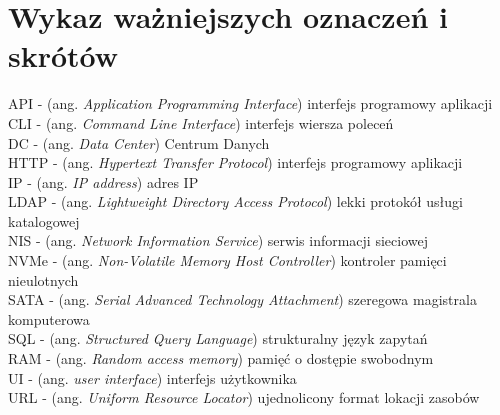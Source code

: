 \documentclass[10pt,a4paper,titlepage,twoside]{report}
\begin{document}
\newpage
{}

\tableofcontents


\newpage
{}
\section*{Wykaz ważniejszych oznaczeń i skrótów}

API - (ang. \textit{Application Programming Interface}) interfejs programowy aplikacji \\ \newline
CLI - (ang. \textit{Command Line Interface}) interfejs wiersza poleceń \\ \newline
DC - (ang. \textit{Data Center}) Centrum Danych \\ \newline
HTTP - (ang. \textit{Hypertext Transfer Protocol}) interfejs programowy aplikacji \\ \newline
IP - (ang. \textit{IP address}) adres IP \\ \newline
LDAP - (ang. \textit{Lightweight Directory Access Protocol}) lekki protokół usługi katalogowej \\ \newline
NIS - (ang. \textit{Network Information Service}) serwis informacji sieciowej \\ \newline
NVMe - (ang. \textit{Non-Volatile Memory Host Controller}) kontroler pamięci nieulotnych \\ \newline
SATA - (ang. \textit{Serial Advanced Technology Attachment}) szeregowa magistrala komputerowa \\ \newline
SQL - (ang. \textit{Structured Query Language}) strukturalny język zapytań \\ \newline
RAM - (ang. \textit{Random access memory}) pamięć o dostępie swobodnym \\ \newline
UI - (ang. \textit{user interface}) interfejs użytkownika \\ \newline
URL - (ang. \textit{Uniform Resource Locator}) ujednolicony format lokacji zasobów \\ \newline
\end{document}
